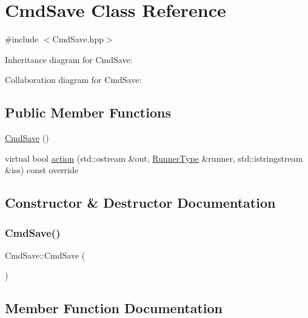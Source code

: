 \hypertarget{classCmdSave}{}\section{Cmd\+Save Class Reference}
\label{classCmdSave}


{\ttfamily \#include $<$Cmd\+Save.\+hpp$>$}



Inheritance diagram for Cmd\+Save\+:


Collaboration diagram for Cmd\+Save\+:
\subsection*{Public Member Functions}
\begin{DoxyCompactItemize}
\item 
\hyperlink{classCmdSave_a43da9362bbde62dc222f3fb0ba6f2b29}{Cmd\+Save} ()
\item 
virtual bool \hyperlink{classCmdSave_a44fb7fe716f0d65f597e7eccb647ba3d}{action} (std\+::ostream \&out, \hyperlink{Command_8hpp_a3594ceaf3c835811a9a67810e7af19f9}{Runner\+Type} \&runner, std\+::istringstream \&iss) const override
\end{DoxyCompactItemize}


\subsection{Constructor \& Destructor Documentation}
\mbox{\label{classCmdSave_a43da9362bbde62dc222f3fb0ba6f2b29}} 
\subsubsection{\texorpdfstring{Cmd\+Save()}{CmdSave()}}
{\footnotesize\ttfamily Cmd\+Save\+::\+Cmd\+Save (\begin{DoxyParamCaption}{ }\end{DoxyParamCaption})}



\subsection{Member Function Documentation}
\mbox{\label{classCmdSave_a44fb7fe716f0d65f597e7eccb647ba3d}} 
